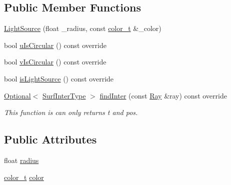 \subsection*{Public Member Functions}
\begin{DoxyCompactItemize}
\item 
\hyperlink{classLightSource_a9ab7d1b421af490fe5c684e00dae44bc}{Light\+Source} (float \+\_\+radius, const \hyperlink{ray_8h_a8a2580fb65f7d3d4e24bdd412b9bd92d}{color\+\_\+t} \&\+\_\+color)
\item 
bool \hyperlink{classLightSource_a6d1e29c394c2ae29c6b913376a3ebbc5}{u\+Is\+Circular} () const override
\item 
bool \hyperlink{classLightSource_a617519569f55a575189f0de58f0b8a11}{v\+Is\+Circular} () const override
\item 
bool \hyperlink{classLightSource_a5d397dd1719c8aaf9d711bace27a9547}{is\+Light\+Source} () const override
\item 
\hyperlink{classOptional}{Optional}$<$ \hyperlink{structSurfInterType}{Surf\+Inter\+Type} $>$ \hyperlink{classLightSource_a7470bd637b7013e310c1a6789d12de92}{find\+Inter} (const \hyperlink{structRay}{Ray} \&ray) const override
\begin{DoxyCompactList}\small\item\em This function is can only returns t and pos. \end{DoxyCompactList}\end{DoxyCompactItemize}
\subsection*{Public Attributes}
\begin{DoxyCompactItemize}
\item 
float \hyperlink{classLightSource_a6dbf2113c6dac64e323ebf4f691d1e66}{radius}
\item 
\hyperlink{ray_8h_a8a2580fb65f7d3d4e24bdd412b9bd92d}{color\+\_\+t} \hyperlink{classLightSource_a4a567c627c51e5850af199a8af6bea27}{color}
\end{DoxyCompactItemize}
